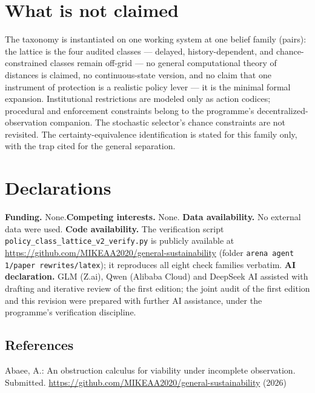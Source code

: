 \documentclass[10pt,twocolumn]{article}
\theoremstyle{definition}
\begin{document}
\section{What is not claimed}

The taxonomy is instantiated on one working system at one belief family
(pairs): the lattice is the four audited classes --- delayed,
history-dependent, and chance-constrained classes remain off-grid --- no
general computational theory of distances is claimed, no continuous-state
version, and no claim that one instrument of protection is a realistic
policy lever --- it is the minimal formal expansion.
Institutional restrictions are modeled only as action codices; procedural
and enforcement constraints belong to the programme's decentralized-
observation companion. The stochastic selector's chance constraints are
not revisited. The certainty-equivalence identification is stated for this
family only, with the trap cited for the general separation.


\section*{Declarations}
\textbf{Funding.} None.\quad \textbf{Competing interests.} None.\quad
\textbf{Data availability.} No external data were used.\quad
\textbf{Code availability.} The verification script
\texttt{policy\_class\_lattice\_v2\_verify.py} is publicly available at
\url{https://github.com/MIKEAA2020/general-sustainability} (folder
\texttt{arena agent 1/paper rewrites/latex}); it reproduces all eight check
families verbatim.\quad
\textbf{AI declaration.} GLM (Z.ai), Qwen (Alibaba Cloud) and DeepSeek AI
assisted with drafting and iterative review of the first edition; the joint
audit of the first edition and this revision were prepared with further AI
assistance, under the programme's verification discipline.

\subsection{References}\label{references}
{\footnotesize

Abaee, A.: An obstruction calculus for viability under incomplete
observation. Submitted.
\url{https://github.com/MIKEAA2020/general-sustainability} (2026)

}
\end{document}
